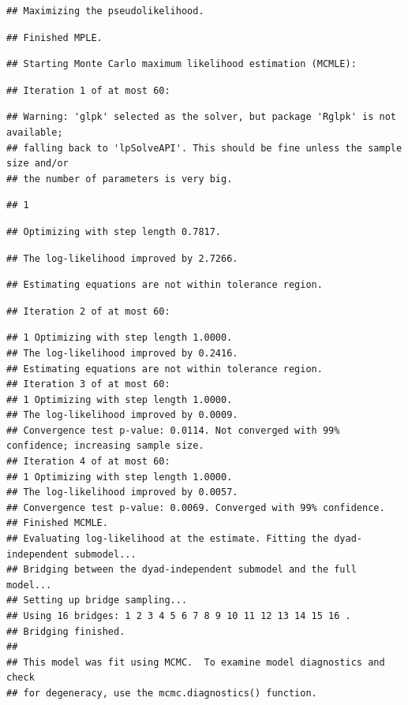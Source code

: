 \documentclass[
]{article}
\begin{document}
\begin{verbatim}
## Maximizing the pseudolikelihood.
\end{verbatim}

\begin{verbatim}
## Finished MPLE.
\end{verbatim}

\begin{verbatim}
## Starting Monte Carlo maximum likelihood estimation (MCMLE):
\end{verbatim}

\begin{verbatim}
## Iteration 1 of at most 60:
\end{verbatim}

\begin{verbatim}
## Warning: 'glpk' selected as the solver, but package 'Rglpk' is not available;
## falling back to 'lpSolveAPI'. This should be fine unless the sample size and/or
## the number of parameters is very big.
\end{verbatim}

\begin{verbatim}
## 1
\end{verbatim}

\begin{verbatim}
## Optimizing with step length 0.7817.
\end{verbatim}

\begin{verbatim}
## The log-likelihood improved by 2.7266.
\end{verbatim}

\begin{verbatim}
## Estimating equations are not within tolerance region.
\end{verbatim}

\begin{verbatim}
## Iteration 2 of at most 60:
\end{verbatim}

\begin{verbatim}
## 1 Optimizing with step length 1.0000.
## The log-likelihood improved by 0.2416.
## Estimating equations are not within tolerance region.
## Iteration 3 of at most 60:
## 1 Optimizing with step length 1.0000.
## The log-likelihood improved by 0.0009.
## Convergence test p-value: 0.0114. Not converged with 99% confidence; increasing sample size.
## Iteration 4 of at most 60:
## 1 Optimizing with step length 1.0000.
## The log-likelihood improved by 0.0057.
## Convergence test p-value: 0.0069. Converged with 99% confidence.
## Finished MCMLE.
## Evaluating log-likelihood at the estimate. Fitting the dyad-independent submodel...
## Bridging between the dyad-independent submodel and the full model...
## Setting up bridge sampling...
## Using 16 bridges: 1 2 3 4 5 6 7 8 9 10 11 12 13 14 15 16 .
## Bridging finished.
## 
## This model was fit using MCMC.  To examine model diagnostics and check
## for degeneracy, use the mcmc.diagnostics() function.
\end{verbatim}
\end{document}
